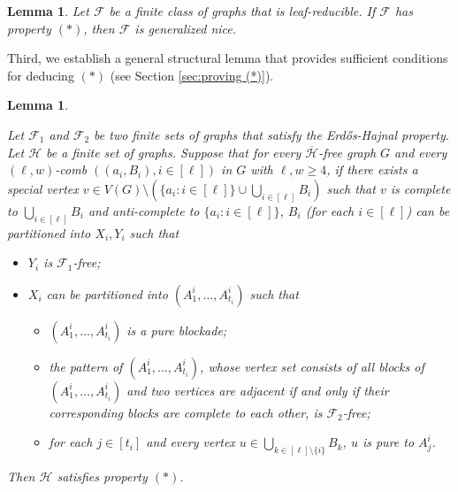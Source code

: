 \documentclass[a4paper,11pt]{article}
\newtheorem{lemma}[theorem]{Lemma}
\begin{document}
    \begin{lemma}\label{lem:reduce gene-nice to comb-property}
        Let $\mathcal{F}$ be a finite class of graphs that is leaf-reducible.
        If $\mathcal{F}$ has property $(*)$, then
        $\mathcal{F}$ is generalized nice. 
    \end{lemma}

    
    Third, we establish a general structural lemma that provides sufficient conditions for deducing $(*)$ (see Section \ref{sec:proving (*)}).

    \begin{lemma}\label{lem:proving (*)}
       
        Let $\mathcal{F}_1$ and $\mathcal{F}_2$ be two finite sets of graphs that satisfy the Erd\H{o}s-Hajnal property. 
        Let $\mathcal{H}$ be a finite set of graphs.
        Suppose that for every $\overline{\mathcal{H}}$-free graph $G$ and every $(\ell,w)$-comb $((a_i,B_i),i\in[\ell])$ in $G$ with $\ell,w\geq 4$, if there exists a special vertex $v\in V(G)\setminus(\{a_i:i\in[\ell]\}\cup\bigcup_{i\in[\ell]}B_i)$ such that $v$ is complete to $\bigcup_{i\in[\ell]}B_i$ and anti-complete to $\{a_i:i\in[\ell]\}$,
        $B_i$ (for each $i\in[\ell]$) can be partitioned into $X_i,Y_i$ such that
        \begin{itemize}
            \item[$(1)$] $Y_i$ is $\mathcal{F}_1$-free;  
            \item[$(2)$] $X_i$ can be partitioned into $(A^i_1,\ldots, A^i_{t_i})$ such that 
            \begin{itemize}
                \item[$(2.1)$] $(A^i_1,\ldots, A^i_{t_i})$ is a pure blockade; 
                \item[$(2.2)$] the pattern of $(A^i_1,\ldots, A^i_{t_i})$, whose vertex set consists of all blocks of $(A^i_1,\ldots, A^i_{t_i})$ and two vertices are adjacent if and only if their corresponding blocks are complete to each other, is $\mathcal{F}_2$-free; 
                \item[$(2.3)$] for each $j\in [t_i]$ and every vertex $u\in \bigcup_{k\in [\ell]\setminus \{i\}} B_k$, $u$ is pure to $A^i_j$.
            \end{itemize}
        \end{itemize} 
        Then $\mathcal{H}$ satisfies property $(*)$.
    \end{lemma}
\end{document}

